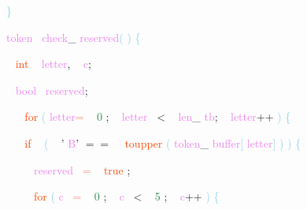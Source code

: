 \documentclass[8, usernames, dvipsnames]{beamer}
\begin{document}
\begin{frame}
\textcolor{SkyBlue}{\} }

 
 \textcolor{Violet}{token}\textcolor{White}{\ }
\textcolor{Violet}{check}\textcolor{Sepia}{\_}
\textcolor{Violet}{reserved}\textcolor{SkyBlue}{(}
\textcolor{SkyBlue}{)}
\textcolor{SkyBlue}{\{ }

 \textcolor{White}{\   }
\textcolor{OrangeRed}{int}
\textcolor{White}{\ }
\textcolor{Violet}{letter}\textcolor{Sepia}{,}
\textcolor{White}{\ }
\textcolor{Violet}{c}\textcolor{Sepia}{;}

 \textcolor{White}{\   }
\textcolor{Violet}{bool}\textcolor{White}{\ }
\textcolor{Violet}{reserved}\textcolor{Sepia}{;}

 \textcolor{White}{\   }
\textcolor{White}{\   }
\textcolor{OrangeRed}{for}
\textcolor{SkyBlue}{(}
\textcolor{Violet}{letter}\textcolor{Salmon}{=}
\textcolor{White}{\ }
\textcolor{SeaGreen}{0}
\textcolor{Sepia}{;}
\textcolor{White}{\ }
\textcolor{Violet}{letter}\textcolor{White}{\ }
\textcolor{OliveGreen}{\textless}
\textcolor{White}{\ }
\textcolor{Violet}{len}\textcolor{Sepia}{\_}
\textcolor{Violet}{tb}\textcolor{Sepia}{;}
\textcolor{White}{\ }
\textcolor{Violet}{letter}\textcolor{Apricot}{++}
\textcolor{SkyBlue}{)}
\textcolor{SkyBlue}{\{ }

 \textcolor{White}{\   }
\textcolor{White}{\   }
\textcolor{OrangeRed}{if}
\textcolor{White}{\ }
\textcolor{SkyBlue}{(}
\textcolor{White}{\ }
\textcolor{BurntOrange}{'}
\textcolor{Violet}{B}\textcolor{BurntOrange}{'}
\textcolor{OliveGreen}{$==$}
\textcolor{White}{\ }
\textcolor{OrangeRed}{toupper}
\textcolor{SkyBlue}{(}
\textcolor{Violet}{token}\textcolor{Sepia}{\_}
\textcolor{Violet}{buffer}\textcolor{SkyBlue}{[}
\textcolor{Violet}{letter}\textcolor{SkyBlue}{]}
\textcolor{SkyBlue}{)}
\textcolor{SkyBlue}{)}
\textcolor{SkyBlue}{\{ }

 \textcolor{White}{\   }
\textcolor{White}{\   }
\textcolor{White}{\   }
\textcolor{Violet}{reserved}\textcolor{White}{\ }
\textcolor{Salmon}{=}
\textcolor{White}{\ }
\textcolor{OrangeRed}{true}
\textcolor{Sepia}{;}

 \textcolor{White}{\   }
\textcolor{White}{\   }
\textcolor{White}{\   }
\textcolor{OrangeRed}{for}
\textcolor{SkyBlue}{(}
\textcolor{Violet}{c}\textcolor{White}{\ }
\textcolor{Salmon}{=}
\textcolor{White}{\ }
\textcolor{SeaGreen}{0}
\textcolor{Sepia}{;}
\textcolor{White}{\ }
\textcolor{Violet}{c}\textcolor{White}{\ }
\textcolor{OliveGreen}{\textless}
\textcolor{White}{\ }
\textcolor{SeaGreen}{5}
\textcolor{Sepia}{;}
\textcolor{White}{\ }
\textcolor{Violet}{c}\textcolor{Apricot}{++}
\textcolor{SkyBlue}{)}
\textcolor{SkyBlue}{\{ }


\end{frame}
\end{document}
